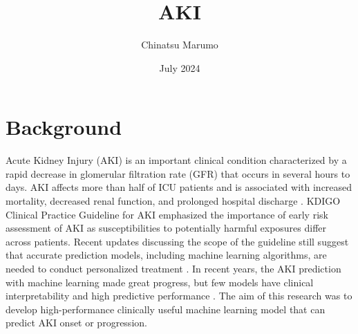 \documentclass{article}
\title{AKI}
\author{Chinatsu Marumo}
\date{July 2024}
\begin{document}
\maketitle

\section{Background}
Acute Kidney Injury (AKI) is an important clinical condition characterized by a rapid decrease in glomerular filtration rate (GFR) that occurs in several hours to days. AKI affects more than half of ICU patients and is associated with increased mortality, decreased renal function, and prolonged hospital discharge \cite{1}. 
KDIGO Clinical Practice Guideline for AKI emphasized the importance of early risk assessment of AKI as susceptibilities to potentially harmful exposures differ across patients. Recent updates discussing the scope of the guideline still suggest that accurate prediction models, including machine learning algorithms, are needed to conduct personalized treatment \cite{2}. 
In recent years, the AKI prediction with machine learning made great progress, but few models have clinical interpretability and high predictive performance \cite{3}. The aim of this research was to develop high-performance clinically useful machine learning model that can predict AKI onset or progression.



\end{document}
